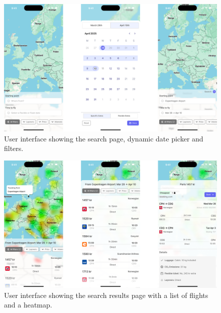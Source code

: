 \newpage
\begin{figure}[h]
    \includegraphics[width=.89\textwidth]{resources/mockup1.png}
    \caption{User interface showing the search page, dynamic date picker and filters.}
\end{figure}

\begin{figure}[h]
    \includegraphics[width=.89\textwidth]{resources/mockup2.png}
    \caption{User interface showing the search results page with a list of flights and a heatmap.}
\end{figure}

\newpage


\newpage
